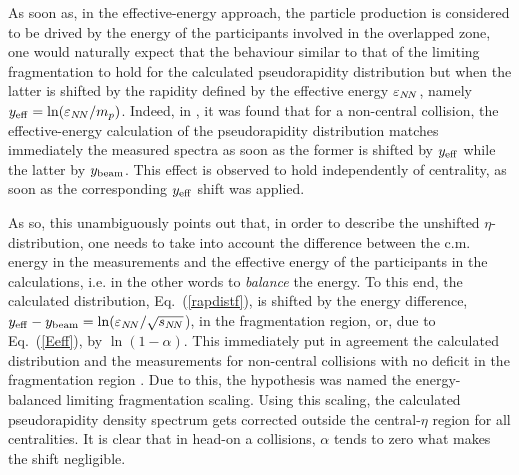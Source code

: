 \documentclass[twocolumn,showpacs,preprintnumbers,prd,superscriptaddress,nofootinbib]{revtex4}
\begin{document}
   As soon as, in the effective-energy approach, 
 the particle 
production is considered to be 
 drived by the energy of the participants involved in the overlapped zone,  
 one would 
 naturally 
 expect that the  
behaviour similar to that of the limiting fragmentation 
 to hold for the calculated pseudorapidity distribution but when the 
latter  is shifted 
by the rapidity defined by the effective energy $\varepsilon_{N\!N}$, namely
 $y_{\rm eff}= \ln(\varepsilon_{N\!N}/m_p)$. 
 Indeed,  in , 
it was 
 found that 
  for a non-central collision, the effective-energy calculation of the  
pseudorapidity distribution 
 matches immediately the measured spectra as soon as the former  is 
shifted by $y_{\rm eff}$ while the latter  by 
    $y_{\rm beam}$. 
 This effect  is observed 
 to hold independently of centrality, as 
 soon as 
the  
corresponding $y_{\rm eff}$ shift 
 was applied.  

 As so, this 
 unambiguously points out that, in order  to describe the unshifted 
$\eta$-distribution, 
  one 
    needs to take into account the difference between the c.m. 
energy in the measurements and the effective energy of the participants 
in the calculations, 
 i.e.
 in the other words  to {\it balance} the energy. 
 To this end, 
the calculated distribution, 
Eq.~(\ref{rapdistf}), is shifted by 
the 
energy difference, $y_{\rm eff}-y_{\rm beam}=\ln (\varepsilon_{N\!N}/\sqrt{s_{N\!N}}$), in the 
fragmentation 
region, or, due to Eq.~(\ref{Eeff}), by $\ln (1-\alpha)$. 
  This immediately put in agreement    
the calculated distribution and the  
measurements for non-central collisions with no deficit in the 
fragmentation region  .
 Due to this, the  hypothesis was named 
 the 
  energy-balanced limiting fragmentation scaling. 
 Using this scaling, 
 the  calculated pseudorapidity density spectrum 
  gets 
  corrected outside the central-$\eta$ region for all centralities.
   It is clear that in head-on a collisions, $\alpha$ tends 
   to zero
    what
    makes the shift negligible. 
\end{document}
